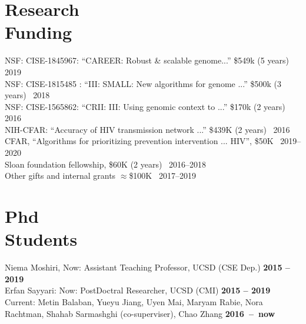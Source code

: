 \documentclass[margin,line,letterpaper]{resume}
\begin{document}
\begin{resume}
    
    
    \section{\mysidestyle Research\\Funding}
      NSF: CISE-1845967:  ``CAREER: Robust \& scalable genome...''
 \$549k (5 years)~
 \hfill 2019\\
      NSF: CISE-1815485 :  ``III: SMALL: New algorithms for genome ...''
 \$500k (3 years)~
 \hfill 2018\\
 NSF: CISE-1565862:  ``CRII: III: Using genomic context to ...''
 \$170k (2 years)~
 \hfill 2016\\
 NIH-CFAR:  ``Accuracy of HIV transmission network ...''
 \$439K (2 years)~
 \hfill 2016\\
 CFAR, ``Algorithms for prioritizing prevention intervention ... HIV'', \$50K \hfill  ~2019--2020\\
  Sloan foundation fellowship, \$60K (2 years) \hfill  ~2016--2018\\
 Other gifts and internal grants $\approx$\$100K  \hfill  ~2017--2019



\section{\mysidestyle Phd \\Students}
    Niema Moshiri, Now: Assistant Teaching Professor, UCSD (CSE Dep.)
 \hfill \textbf{2015 -- 2019}\\
     Erfan Sayyari:  Now: PostDoctral Researcher, UCSD (CMI)
 \hfill \textbf{2015 -- 2019}\\
Current: Metin Balaban, Yueyu Jiang, Uyen Mai, Maryam Rabie, Nora Rachtman, Shahab Sarmashghi (co-superviser), Chao Zhang \hfill \textbf{2016~--~now}





    \renewcommand*{\thefootnote}{\fnsymbol{footnote}}

\end{resume}
\end{document}
